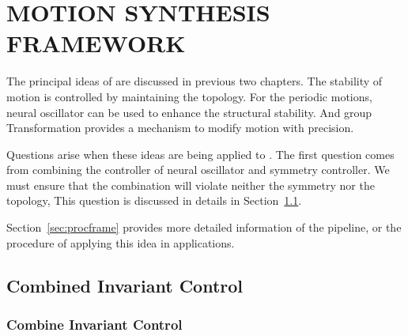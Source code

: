 \chapter {MOTION SYNTHESIS FRAMEWORK}
\label{chap:msf}
\graphicspath{{CombineFramework/CombineFrameworkFigs/EPS/}{CombineFramework/CombineFrameworkFigs/}}
The principal ideas of \moit are discussed in previous two chapters.
The stability of motion is controlled by maintaining the topology.
For the periodic motions, neural oscillator can be used to enhance the structural stability.
And group Transformation provides a mechanism to modify motion with precision.


Questions arise when these ideas are being applied  to \cms.
The first question comes from combining the controller of neural oscillator and symmetry controller.
We must ensure that the combination will violate neither the symmetry nor the topology,
This question is discussed in details in Section~\ref{sec:combin}.


Section~\ref{sec:procframe} provides more detailed information of the pipeline, or the procedure of applying this idea in \cms applications.

%
%
%
%

\section{Combined Invariant Control}
\label{sec:combin}
\subsection{ Combine Invariant Control}

